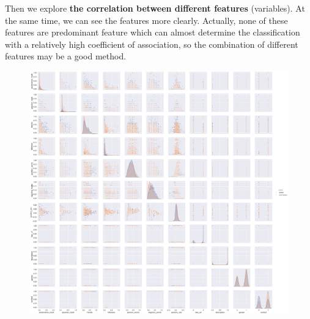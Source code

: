 \documentclass[12pt,a4paper]{article}
\begin{document}
Then we explore \textbf{the correlation between different features} (variables). At the same time, we can see the features more clearly. Actually, none of these features are predominant feature which can almost determine the classification with a relatively high coefficient of association, so the combination of different features may be a good method. 

\begin{figure}[h]
	\centering
	\includegraphics[height=1\linewidth]{pic/pairplot}
\end{figure}
\end{document}

